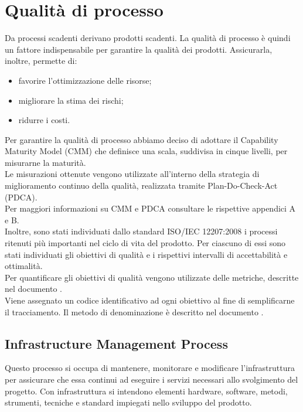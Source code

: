 \documentclass[PianoDiQualifica.tex]{subfiles}
\begin{document}
\section{Qualità di processo}
	Da processi scadenti derivano prodotti scadenti. La qualità di processo è quindi un fattore
	indispensabile per garantire la qualità dei prodotti. Assicurarla, inoltre, permette di:
	\begin{itemize} 
		\item favorire l'ottimizzazione delle risorse;
		\item migliorare la stima dei rischi;
		\item ridurre i costi.
	\end{itemize}
	
	Per garantire la qualità di processo abbiamo deciso di adottare il Capability Maturity Model (CMM)
	che definisce una scala, suddivisa in cinque livelli, per misurarne la maturità. \\
	Le misurazioni ottenute vengono utilizzate all'interno della strategia di miglioramento continuo della
	qualità, realizzata tramite Plan-Do-Check-Act (PDCA). \\
	Per maggiori informazioni su CMM e PDCA consultare le rispettive appendici A e B. \\
	Inoltre, sono stati individuati dallo standard ISO/IEC 12207:2008 i processi ritenuti più importanti
	nel ciclo di vita del prodotto. Per ciascuno di essi sono stati individuati gli obiettivi di qualità
	e i rispettivi intervalli di accettabilità e ottimalità. \\
	Per quantificare gli obiettivi di qualità vengono utilizzate delle metriche, descritte nel documento
	\NPdocRP{}. \\
	Viene assegnato un codice identificativo ad ogni obiettivo al fine di semplificarne il tracciamento.
	Il metodo di denominazione è descritto nel documento \NPdocRP{}.
	
	\subsection{Infrastructure Management Process}
		Questo processo si occupa di mantenere, monitorare e modificare l'infrastruttura per assicurare
		che essa continui ad eseguire i servizi necessari allo svolgimento del progetto.
		Con infrastruttura si intendono elementi hardware, software, metodi, strumenti, tecniche e standard
		impiegati nello sviluppo del prodotto. \\
		
\end{document}
